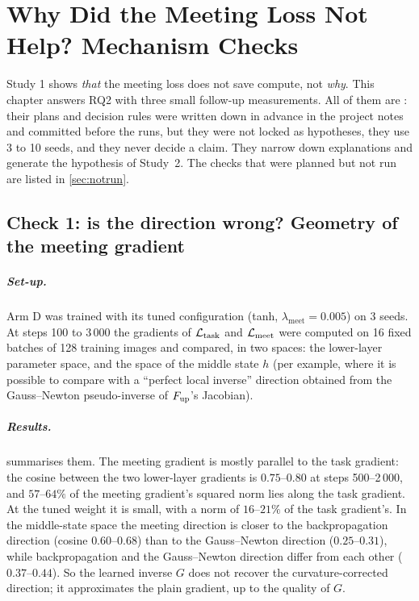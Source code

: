 \chapter{Why Did the Meeting Loss Not Help? Mechanism Checks}\label{ch:mechanism}

Study 1 shows \emph{that} the meeting loss does not save compute, not \emph{why}. This chapter answers RQ2 with three small follow-up measurements. All of them are \tierE{}: their plans and decision rules were written down in advance in the project notes and committed before the runs, but they were not locked as hypotheses, they use 3 to 10 seeds, and they never decide a claim. They narrow down explanations and generate the hypothesis of Study~2. The checks that were planned but not run are listed in \cref{sec:notrun}.

\section{Check 1: is the direction wrong? Geometry of the meeting gradient}\label{sec:geometry}
\paragraph{Set-up.} Arm D was trained with its tuned configuration (tanh, $\lambda_{\mathrm{meet}}=0.005$) on 3 seeds. At steps 100 to 3\,000 the gradients of $\mathcal{L}_{\mathrm{task}}$ and $\mathcal{L}_{\mathrm{meet}}$ were computed on 16 fixed batches of 128 training images and compared, in two spaces: the lower-layer parameter space, and the space of the middle state $h$ (per example, where it is possible to compare with a ``perfect local inverse'' direction obtained from the Gauss--Newton pseudo-inverse of $F_{\mathrm{up}}$'s Jacobian).

\paragraph{Results.}  summarises them. The meeting gradient is mostly parallel to the task gradient: the cosine between the two lower-layer gradients is $0.75$--$0.80$ at steps 500--2\,000, and $57$--$64\%$ of the meeting gradient's squared norm lies along the task gradient. At the tuned weight it is small, with a norm of $16$--$21\%$ of the task gradient's. In the middle-state space the meeting direction is closer to the backpropagation direction (cosine $0.60$--$0.68$) than to the Gauss--Newton direction ($0.25$--$0.31$), while backpropagation and the Gauss--Newton direction differ from each other ($0.37$--$0.44$). So the learned inverse $G$ does not recover the curvature-corrected direction; it approximates the plain gradient, up to the quality of $G$.


